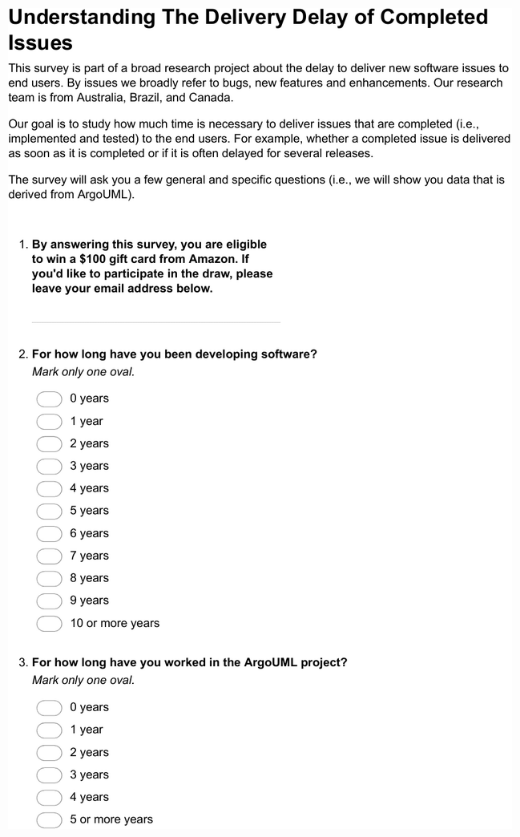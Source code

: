 \documentclass[
	12pt,				%
	openright,			%
	oneside,			%
	a4paper,			%
	french,				%
	spanish,			%
	brazil,				%
	english
	]{abntex2}
\newcounter{pt}
\newcounter{th}
\begin{document}
\begin{apendicesenv}
\includegraphics[width=.8\textwidth,keepaspectratio]{chapters/chapter5/appendix/ArgoUML1.pdf}


\end{apendicesenv}
\end{document}
